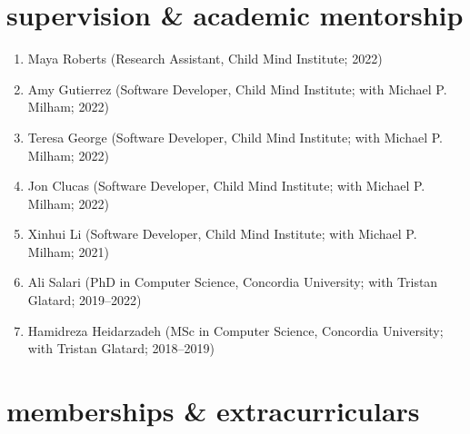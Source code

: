 \documentclass[]{friggeri-cv} %
\begin{document}
\section{supervision \& academic mentorship}
\begin{enumerate}
\item Maya Roberts (Research Assistant, Child Mind Institute; 2022)
\item Amy Gutierrez (Software Developer, Child Mind Institute; with Michael P. Milham; 2022)
\item Teresa George (Software Developer, Child Mind Institute; with Michael P. Milham; 2022)
\item Jon Clucas (Software Developer, Child Mind Institute; with Michael P. Milham; 2022)
\item Xinhui Li (Software Developer, Child Mind Institute; with Michael P. Milham; 2021)
\item Ali Salari (PhD in Computer Science, Concordia University; with Tristan Glatard; 2019–2022)
\item Hamidreza Heidarzadeh (MSc in Computer Science, Concordia University; with Tristan Glatard; 2018–2019)
\end{enumerate}

\section{memberships \& extracurriculars}
\end{document}
